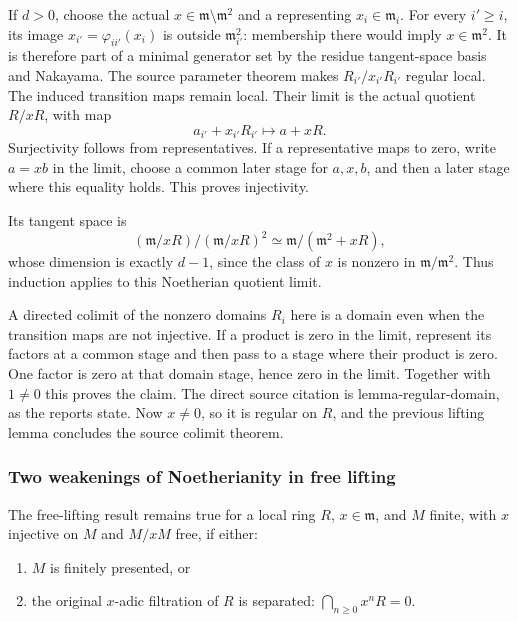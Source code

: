 If \(d>0\), choose the actual \(x\in\mathfrak m\setminus\mathfrak m^2\) and a representing \(x_i\in\mathfrak m_i\). For every \(i'\ge i\), its image \(x_{i'}=\varphi_{ii'}(x_i)\) is outside \(\mathfrak m_{i'}^2\): membership there would imply \(x\in\mathfrak m^2\). It is therefore part of a minimal generator set by the residue tangent-space basis and Nakayama. The source parameter theorem makes \(R_{i'}/x_{i'}R_{i'}\) regular local. The induced transition maps remain local. Their limit is the actual quotient \(R/xR\), with map \[
 a_{i'}+x_{i'}R_{i'}\longmapsto a+xR.
\] Surjectivity follows from representatives. If a representative maps to zero, write \(a=xb\) in the limit, choose a common later stage for \(a,x,b\), and then a later stage where this equality holds. This proves injectivity.

Its tangent space is \[
 (\mathfrak m/xR)/(\mathfrak m/xR)^2
 \simeq\mathfrak m/(\mathfrak m^2+xR),
\] whose dimension is exactly \(d-1\), since the class of \(x\) is nonzero in \(\mathfrak m/\mathfrak m^2\). Thus induction applies to this Noetherian quotient limit.

A directed colimit of the nonzero domains \(R_i\) here is a domain even when the transition maps are not injective. If a product is zero in the limit, represent its factors at a common stage and then pass to a stage where their product is zero. One factor is zero at that domain stage, hence zero in the limit. Together with \(1\ne0\) this proves the claim. The direct source citation is lemma-regular-domain, as the reports state. Now \(x\ne0\), so it is regular on \(R\), and the previous lifting lemma concludes the source colimit theorem.

\subsubsection{Two weakenings of Noetherianity in free lifting}\label{algebra-proof-020-two-weakenings-of-noetherianity-in-free-lifting}

The free-lifting result remains true for a local ring \(R\), \(x\in\mathfrak m\), and \(M\) finite, with \(x\) injective on \(M\) and \(M/xM\) free, if either:

\begin{enumerate}
\def\labelenumi{(\alph{enumi})}
\item
  \(M\) is finitely presented, or
\item
  the original \(x\)-adic filtration of \(R\) is separated: \(\bigcap_{n\ge0}x^nR=0\).
\end{enumerate}

